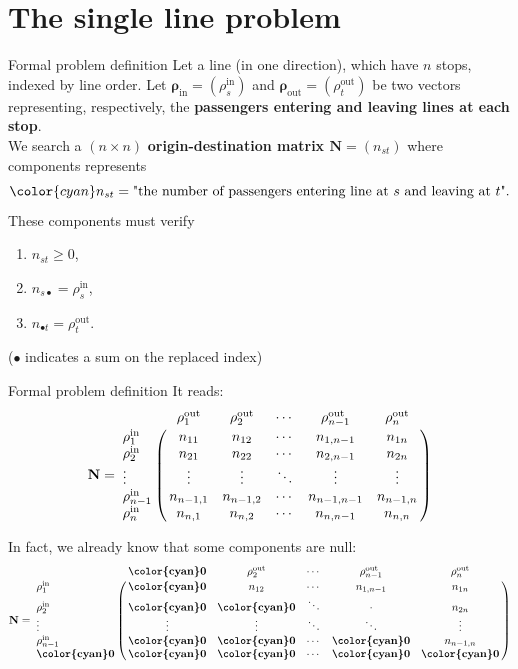 \documentclass[10pt]{beamer}
\newcommand{\imp}[1]{\textbf{\color{cyan}#1}}
\begin{document}
	\section{The single line problem}
	
	
	\begin{frame}{Formal problem definition}
		Let a line (in one direction), which have $n$ stops, indexed by line order. Let $\bm{\rho}_\text{in} = (\rho^\text{in}_s)$ and $\bm{\rho}_\text{out} = (\rho^\text{out}_t)$ be two vectors representing, respectively, the \imp{passengers entering and leaving lines at each stop}. \\
		\vspace{0.4cm}
		We search a $(n \times n)$ \imp{origin-destination matrix $\mathbf{N} = (n_{st})$} where components represents
		$$
			{\color{cyan} n_{st} = \text{"the number of passengers entering line at $s$ and leaving at $t$"}}.
		$$
		These components must verify
		\begin{enumerate}
			\item $n_{st} \geq 0$,
			\item $n_{s\bullet} = \rho^\text{in}_s$,
			\item $n_{\bullet t} = \rho^\text{out}_t$.
		\end{enumerate}
		\small ($\bullet$ indicates a sum on the replaced index)
	\end{frame}
	
	
	\begin{frame}{Formal problem definition}
		\small
		It reads:
		$$
		\mathbf{N} = \bordermatrix{
			& \rho^\text{out}_1 & \rho^\text{out}_2  & \cdots & \rho^\text{out}_{n-1} & \rho^\text{out}_n   \cr
			\rho^\text{in}_1 & n_{11} & n_{12} & \cdots & n_{1,n-1} & n_{1n} \cr
			\rho^\text{in}_2 & n_{21} & n_{22} & \cdots & n_{2,n-1} & n_{2n} \cr
			\vdots & \vdots & \vdots & \ddots & \vdots & \vdots \cr
			\rho^\text{in}_{n-1} & n_{n-1,1} & n_{n-1,2} & \cdots & n_{n-1,n-1} & n_{n-1,n} \cr
			\rho^\text{in}_{n} & n_{n,1} & n_{n,2} & \cdots & n_{n,n-1} & n_{n,n}}
		$$
		
		In fact, we already know that some components are null:
		$$
		\mathbf{N} = \bordermatrix{
			& \imp{0} & \rho^\text{out}_2  & \cdots & \rho^\text{out}_{n-1} & \rho^\text{out}_n \cr
			\rho^\text{in}_1 & \imp{0} & n_{12} & \cdots & n_{1,n-1} & n_{1n} \cr
			\rho^\text{in}_2 & \imp{0} & \imp{0} & \ddots & \cdot & n_{2n} \cr
			\vdots & \vdots & \vdots & \ddots & \ddots & \vdots \cr
			\rho^\text{in}_{n-1} & \imp{0} & \imp{0} & \cdots & \imp{0} & n_{n-1,n} \cr
			\imp{0} & \imp{0} & \imp{0} & \cdots & \imp{0} & \imp{0}}
		$$
	\end{frame}
	
\end{document}
